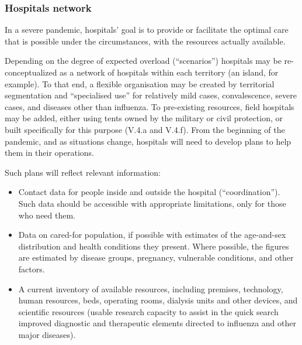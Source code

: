 \documentclass[12pt, a4]{scrartcl}
\begin{document}
\subsubsection{Hospitals network}
In a severe pandemic, hospitals' goal is to provide or facilitate the optimal care that is possible under the circumstances, with the resources actually available.

Depending on the degree of expected overload (“scenarios”) hospitals may be re-conceptualized as a network of hospitals within each territory (an island, for example). To that end, a flexible organisation may be created by territorial segmentation and “specialised use” for relatively mild cases, convalescence, severe cases, and diseases other than influenza. To pre-existing resources, field hospitals may be added, either using tents owned by the military or civil protection, or built specifically for this purpose (V.4.a and V.4.f).
From the beginning of the pandemic, and as situations change, hospitals will need to develop plans to help them in their operations.

Such plans will reflect relevant information:

\begin{itemize}
	\item Contact data for people inside and outside the hospital (“coordination”). Such data should be accessible with appropriate limitations, only for those who need them.
	\item Data on cared-for population, if possible with estimates of the age-and-sex distribution and health conditions they present. Where possible, the figures are estimated by disease groups, pregnancy, vulnerable conditions, and other factors.
	\item A current inventory of available resources, including premises, technology, human resources, beds, operating rooms, dialysis units and other devices, and scientific resources (usable research capacity to assist in the quick search improved diagnostic and therapeutic elements directed to influenza and other major diseases).
\end{itemize}
\end{document}
